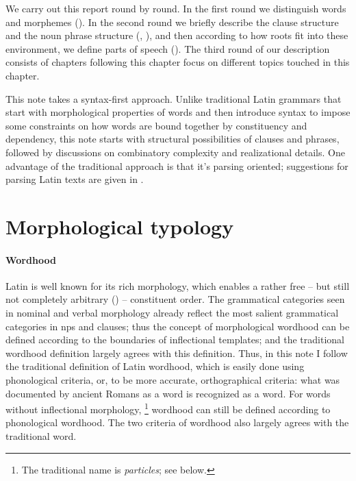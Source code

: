 \documentclass[a4paper, oneside, 12pt]{report}
\newcommand*{\term}[1]{\emph{#1}}
\begin{document}
We carry out this report round by round.
In the first round we distinguish words and morphemes
().
In the second round we briefly describe the clause structure and the noun phrase structure
(, ),
and then according to how roots fit into these environment,
we define parts of speech (). 
The third round of our description
consists of chapters following this chapter focus on different topics touched in this chapter.

This note takes a syntax-first approach.
Unlike traditional Latin grammars that start with morphological properties of words
and then introduce syntax to impose some constraints on how words are bound together
by constituency and dependency,
this note starts with structural possibilities of clauses and phrases,
followed by discussions on combinatory complexity and realizational details.
One advantage of the traditional approach is that it's parsing oriented;
suggestions for parsing Latin texts are given in .

\section{Morphological typology}\label{sec:grammatical.word}

\paragraph*{Wordhood}

Latin is well known for its rich morphology,
which enables a rather free -- but still not completely arbitrary ()
-- constituent order.
The grammatical categories seen in nominal and verbal morphology 
already reflect the most salient grammatical categories
in \acs{np}s and clauses;
thus the concept of morphological wordhood can be defined according to 
the boundaries of inflectional templates;
and the traditional wordhood definition largely agrees with this definition. 
Thus, in this note I follow the traditional definition of Latin wordhood,
which is easily done using phonological criteria,
or, to be more accurate, orthographical criteria: 
what was documented by ancient Romans as a word 
is recognized as a word.
For words without inflectional morphology,%
\footnote{
    The traditional name is \term{particles};
    see below.
} 
wordhood can still be defined according to phonological wordhood.
The two criteria of wordhood also largely agrees with the traditional word.
\end{document}
